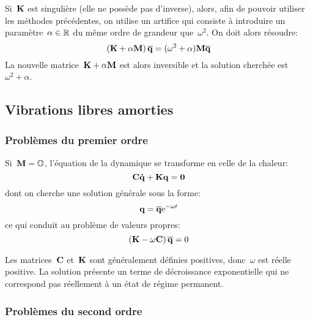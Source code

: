 \begin{remarque}
Si~$\MM{K}$ est singulière (elle ne possède pas d'inverse), alors, afin de pouvoir utiliser les méthodes précédentes, on utilise un artifice qui consiste à introduire un paramètre~$\alpha\in\mathbb R$ du même ordre de grandeur que~$\omega^2$. On doit alors résoudre:
\begin{equation}\left(\MM{K}+\alpha \MM{M}\right)\VV{\overline{q}} = (\omega^2+\alpha)\MM{M} \VV{\overline{q}}\end{equation}
La nouvelle matrice~$\MM{K}+\alpha \MM{M}$ est alors inversible et la solution cherchée est~$\omega^2+\alpha$.
\end{remarque}

\medskip
\subsection{Vibrations libres amorties}

\subsubsection{Problèmes du premier ordre}

Si~$\MM{M}=\MM{\mO}$, l'équation de la dynamique se transforme en celle de la chaleur:
\begin{equation} \MM{C}\VV{\dot{q}}+\MM{K}\VV{q}=\VV{0} \end{equation}
dont on cherche une solution générale sous la forme:
\begin{equation} \VV{q}=\VV{\overline{q}}\mathrm{e}^{-\omega t} \end{equation}
ce qui conduit au problème de valeurs propres:
\begin{equation} \left(\MM{K}-\omega\MM{C}\right)\VV{\overline{q}}=0\end{equation}

Les matrices~$\MM{C}$ et~$\MM{K}$ sont généralement définies positives, donc~$\omega$ est réelle positive. La solution présente un terme de décroissance exponentielle qui ne correspond pas réellement à un état de régime permanent.

\medskip
\subsubsection{Problèmes du second ordre}

